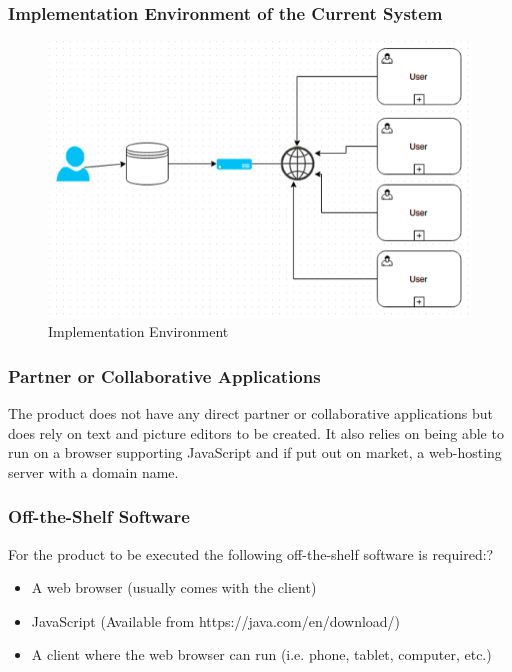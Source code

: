 \documentclass[11pt, oneside]{article}   	%
\begin{document}
\subsubsection*{Implementation Environment of the Current System}
\begin{figure}[H] %
   \centering
   \includegraphics[width=6in]{ImplementationEnvironment.png} 
   \caption{Implementation Environment}
   \label{fig:example}
\end{figure}


\subsubsection*{Partner or Collaborative Applications}
The product does not have any direct partner or collaborative applications but does rely on text and picture editors to be created. It also relies on being able to run on a browser supporting JavaScript and if put out on market, a web-hosting server with a domain name.


\subsubsection*{Off-the-Shelf Software}
For the product to be executed the following off-the-shelf software is required:?\begin{itemize}
\item
A web browser (usually comes with the client)
\item
JavaScript (Available from https://java.com/en/download/)
\item
A client where the web browser can run (i.e. phone, tablet, computer, etc.)
\end{itemize}
\end{document}

